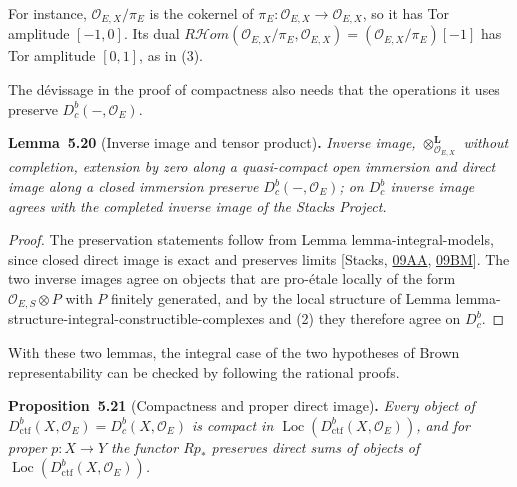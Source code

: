 \documentclass[11pt]{article}
\newenvironment{bpstatement}[2]{\par\addvspace{0.6\baselineskip}\noindent\textbf{#1}#2\textbf{.}\enspace\ignorespaces}
  {\par\addvspace{0.4\baselineskip}}
\newenvironment{bpstatementit}[2]{\begin{bpstatement}{#1}{#2}\itshape\ignorespaces}{\end{bpstatement}}
\providecommand{\Dbc}{}\renewcommand{\Dbc}{D^b_c}
\providecommand{\Loc}{}\renewcommand{\Loc}{\operatorname{Loc}}
\providecommand{\cHom}{}\renewcommand{\cHom}{R\mathcal{H}\!om}
\begin{document}
\label{bp67}%
For instance, \(\mathcal O_{E,X}/\pi_E\) is the cokernel of \(\pi_E:\mathcal O_{E,X}\to\mathcal O_{E,X}\), so it has Tor amplitude \([-1,0]\). Its dual \(\cHom(\mathcal O_{E,X}/\pi_E,\mathcal O_{E,X})=
(\mathcal O_{E,X}/\pi_E)[-1]\) has Tor amplitude \([0,1]\), as in (3).

The dévissage in the proof of compactness also needs that the operations it uses preserve \(\Dbc(-,\mathcal O_E)\).

\label{bp68}%
\begin{bpstatementit}{Lemma~5.20}{ (Inverse image and tensor product)}
Inverse image, \(\otimes^{\mathbf L}_{\mathcal O_{E,X}}\) without completion, extension by zero along a quasi-compact open immersion and direct image along a closed immersion preserve \(\Dbc(-,\mathcal O_E)\); on \(\Dbc\) inverse image agrees with the completed inverse image of the Stacks Project.
\end{bpstatementit}

\begin{proof}[{Proof}]\label{bp69}%
The preservation statements follow from Lemma lemma-integral-models, since closed direct image is exact and preserves limits [Stacks, \href{https://stacks.math.columbia.edu/tag/09AA}{09AA}, \href{https://stacks.math.columbia.edu/tag/09BM}{09BM}]. The two inverse images agree on objects that are pro-étale locally of the form \(\mathcal O_{E,S}\otimes P\) with \(P\) finitely generated, and by the local structure of Lemma lemma-structure-integral-constructible-complexes and (2) they therefore agree on \(\Dbc\).
\end{proof}

\label{bp70}%
With these two lemmas, the integral case of the two hypotheses of Brown representability can be checked by following the rational proofs.

\label{bp71}%
\begin{bpstatementit}{Proposition~5.21}{ (Compactness and proper direct image)}
Every object of \(D^b_{\mathrm{ctf}}(X,\mathcal O_E)=\Dbc(X,\mathcal O_E)\) is compact in \(\Loc(D^b_{\mathrm{ctf}}(X,\mathcal O_E))\), and for proper \(p:X\to Y\) the functor \(Rp_*\) preserves direct sums of objects of \(\Loc(D^b_{\mathrm{ctf}}(X,\mathcal O_E))\).
\end{bpstatementit}
\end{document}
